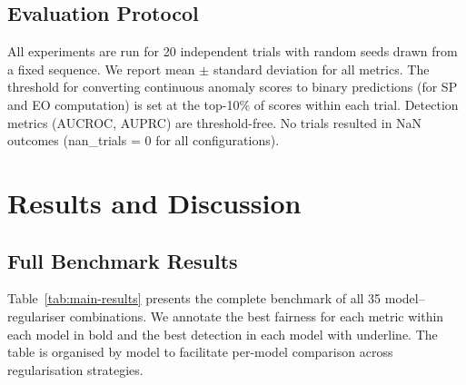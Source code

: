 \documentclass[sigconf,natbib=false]{acmart}
\begin{document}
\subsection{Evaluation Protocol}

All experiments are run for 20 independent trials with random seeds drawn from a fixed sequence. We report mean $\pm$ standard deviation for all metrics. The threshold for converting continuous anomaly scores to binary predictions (for SP and EO computation) is set at the top-10\% of scores within each trial. Detection metrics (AUCROC, AUPRC) are threshold-free. No trials resulted in NaN outcomes (nan\_trials = 0 for all configurations).

\section{Results and Discussion}

\subsection{Full Benchmark Results}

Table~\ref{tab:main-results} presents the complete benchmark of all 35 model–regulariser combinations. We annotate the best fairness for each metric within each model in bold and the best detection in each model with underline. The table is organised by model to facilitate per-model comparison across regularisation strategies.
\end{document}
